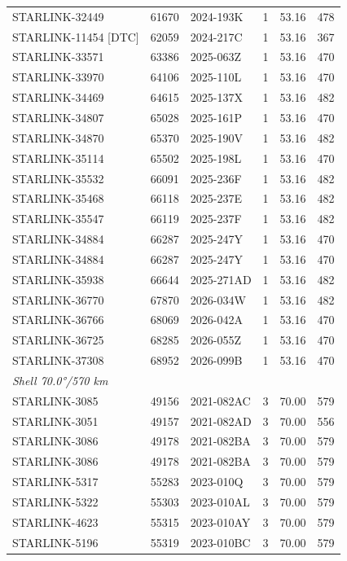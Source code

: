 \begin{longtable}{lllccc}
STARLINK-32449 & 61670 & 2024-193K & 1 & 53.16 & 478 \\
STARLINK-11454 [DTC] & 62059 & 2024-217C & 1 & 53.16 & 367 \\
STARLINK-33571 & 63386 & 2025-063Z & 1 & 53.16 & 470 \\
STARLINK-33970 & 64106 & 2025-110L & 1 & 53.16 & 470 \\
STARLINK-34469 & 64615 & 2025-137X & 1 & 53.16 & 482 \\
STARLINK-34807 & 65028 & 2025-161P & 1 & 53.16 & 470 \\
STARLINK-34870 & 65370 & 2025-190V & 1 & 53.16 & 482 \\
STARLINK-35114 & 65502 & 2025-198L & 1 & 53.16 & 470 \\
STARLINK-35532 & 66091 & 2025-236F & 1 & 53.16 & 482 \\
STARLINK-35468 & 66118 & 2025-237E & 1 & 53.16 & 482 \\
STARLINK-35547 & 66119 & 2025-237F & 1 & 53.16 & 482 \\
STARLINK-34884 & 66287 & 2025-247Y & 1 & 53.16 & 470 \\
STARLINK-34884 & 66287 & 2025-247Y & 1 & 53.16 & 470 \\
STARLINK-35938 & 66644 & 2025-271AD & 1 & 53.16 & 482 \\
STARLINK-36770 & 67870 & 2026-034W & 1 & 53.16 & 482 \\
STARLINK-36766 & 68069 & 2026-042A & 1 & 53.16 & 470 \\
STARLINK-36725 & 68285 & 2026-055Z & 1 & 53.16 & 470 \\
STARLINK-37308 & 68952 & 2026-099B & 1 & 53.16 & 470 \\
\midrule
\multicolumn{6}{l}{\textit{Shell 70.0°/570 km}} \\
STARLINK-3085 & 49156 & 2021-082AC & 3 & 70.00 & 579 \\
STARLINK-3051 & 49157 & 2021-082AD & 3 & 70.00 & 556 \\
STARLINK-3086 & 49178 & 2021-082BA & 3 & 70.00 & 579 \\
STARLINK-3086 & 49178 & 2021-082BA & 3 & 70.00 & 579 \\
STARLINK-5317 & 55283 & 2023-010Q & 3 & 70.00 & 579 \\
STARLINK-5322 & 55303 & 2023-010AL & 3 & 70.00 & 579 \\
STARLINK-4623 & 55315 & 2023-010AY & 3 & 70.00 & 579 \\
STARLINK-5196 & 55319 & 2023-010BC & 3 & 70.00 & 579 \\

\end{longtable}
